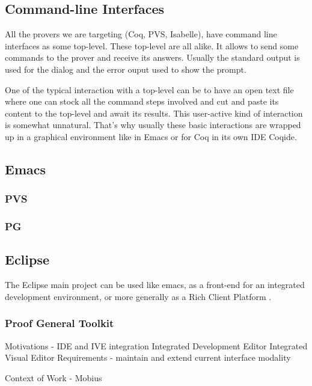 \documentclass{entcs}
\begin{document}
\subsection{Command-line Interfaces}
All the provers we are targeting (Coq, PVS, Isabelle), have command line interfaces as 
some top-level. These top-level are all alike. It allows to send some commands
to the prover and receive its answers. Usually the standard output is
used for the dialog and the error ouput used to show the prompt.

One of the typical interaction with a top-level can be to have an open text file
where one can stock all the command steps involved and cut and paste its 
content to the top-level and await its results. This user-active kind of 
interaction is somewhat unnatural. That's why usually these basic interactions
are wrapped up in a graphical environment like in Emacs or for Coq
in its own IDE Coqide.



\subsection{Emacs}
\subsubsection{PVS }
\subsubsection{PG}
\subsection{Eclipse}
The Eclipse main project can be used like emacs, as a front-end 
for an integrated development environment, or more generally as
a Rich Client Platform \cite{eclipse-rcp}. 
\subsubsection{Proof General Toolkit}

Motivations - IDE and IVE integration
Integrated Development Editor
Integrated Visual Editor
Requirements - maintain and extend current interface modality

Context of Work - Mobius
\end{document}
